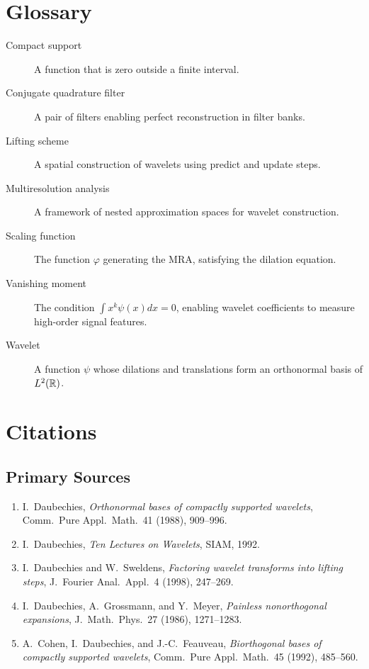 \section*{Glossary}

\begin{description}
    \item[Compact support] A function that is zero outside a finite interval.
    \item[Conjugate quadrature filter] A pair of filters enabling perfect reconstruction in filter banks.
    \item[Lifting scheme] A spatial construction of wavelets using predict and update steps.
    \item[Multiresolution analysis] A framework of nested approximation spaces for wavelet construction.
    \item[Scaling function] The function $\varphi$ generating the MRA, satisfying the dilation equation.
    \item[Vanishing moment] The condition $\int x^k \psi(x) dx = 0$, enabling wavelet coefficients to measure high-order signal features.
    \item[Wavelet] A function $\psi$ whose dilations and translations form an orthonormal basis of $L^2(\mathbb{R})$.
\end{description}

\section{Citations}\subsection*{Primary Sources}
\begin{enumerate}
    \item I.\ Daubechies, \textit{Orthonormal bases of compactly supported wavelets}, Comm.\ Pure Appl.\ Math.\ 41 (1988), 909--996.
    \item I.\ Daubechies, \textit{Ten Lectures on Wavelets}, SIAM, 1992.
    \item I.\ Daubechies and W.\ Sweldens, \textit{Factoring wavelet transforms into lifting steps}, J.\ Fourier Anal.\ Appl.\ 4 (1998), 247--269.
    \item I.\ Daubechies, A.\ Grossmann, and Y.\ Meyer, \textit{Painless nonorthogonal expansions}, J.\ Math.\ Phys.\ 27 (1986), 1271--1283.
    \item A.\ Cohen, I.\ Daubechies, and J.-C.\ Feauveau, \textit{Biorthogonal bases of compactly supported wavelets}, Comm.\ Pure Appl.\ Math.\ 45 (1992), 485--560.
\end{enumerate}

